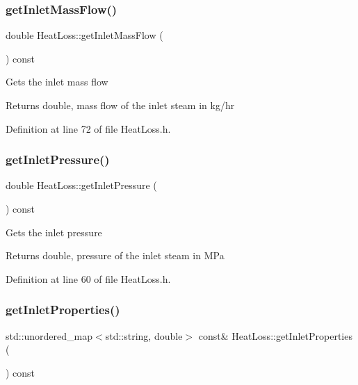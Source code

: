 \subsubsection{\texorpdfstring{get\+Inlet\+Mass\+Flow()}{getInletMassFlow()}}
{\footnotesize\ttfamily double Heat\+Loss\+::get\+Inlet\+Mass\+Flow (\begin{DoxyParamCaption}{ }\end{DoxyParamCaption}) const\hspace{0.3cm}{\ttfamily [inline]}}

Gets the inlet mass flow \begin{DoxyReturn}{Returns}
double, mass flow of the inlet steam in kg/hr 
\end{DoxyReturn}


Definition at line 72 of file Heat\+Loss.\+h.

\mbox{\label{class_heat_loss_a09e6e05477fd6794ea7f42bb43da2f50}} 
\subsubsection{\texorpdfstring{get\+Inlet\+Pressure()}{getInletPressure()}}
{\footnotesize\ttfamily double Heat\+Loss\+::get\+Inlet\+Pressure (\begin{DoxyParamCaption}{ }\end{DoxyParamCaption}) const\hspace{0.3cm}{\ttfamily [inline]}}

Gets the inlet pressure \begin{DoxyReturn}{Returns}
double, pressure of the inlet steam in M\+Pa 
\end{DoxyReturn}


Definition at line 60 of file Heat\+Loss.\+h.

\mbox{\label{class_heat_loss_ac9fe13c199ec41ef6fafe85523a27040}} 
\subsubsection{\texorpdfstring{get\+Inlet\+Properties()}{getInletProperties()}}
{\footnotesize\ttfamily std\+::unordered\+\_\+map$<$std\+::string, double$>$ const\& Heat\+Loss\+::get\+Inlet\+Properties (\begin{DoxyParamCaption}{ }\end{DoxyParamCaption}) const\hspace{0.3cm}{\ttfamily [inline]}}

